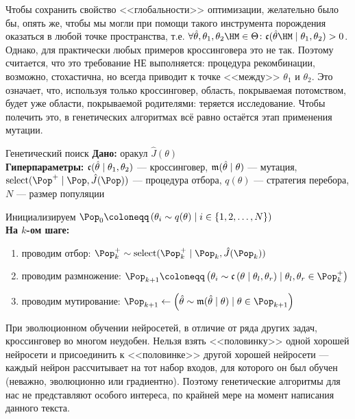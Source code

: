 Чтобы сохранить свойство <<глобальности>> оптимизации, желательно было бы, опять же, чтобы мы могли при помощи такого инструмента порождения оказаться в любой точке пространства, т.е. $\forall \hat{\theta}, \theta_1, \theta_2 \HM\in \Theta \colon \cross(\hat{\theta} \HM\mid \theta_1, \theta_2) > 0$. Однако, для практически любых примеров кроссинговера это не так. Поэтому считается, что это требование НЕ выполняется: процедура рекомбинации, возможно, стохастична, но всегда приводит к точке <<между>> $\theta_1$ и $\theta_2$. Это означает, что, используя только кроссинговер, область, покрываемая потомством, будет уже области, покрываемой родителями: теряется исследование. Чтобы полечить это, в генетических алгоритмах всё равно остаётся этап применения мутации.

\begin{algorithm}[label=geneticsearch]{Генетический поиск}
\textbf{Дано:} оракул $\hat{J}(\theta)$ \\
\textbf{Гиперпараметры:} $\mathfrak{c}(\hat{\theta} \mid \theta_1, \theta_2)$ --- кроссинговер, $\mathfrak{m}(\hat{\theta} \mid \theta)$ --- мутация, $\Sel(\Pop^+ \mid \Pop, \hat{J}(\Pop))$ --- процедура отбора, $q(\theta)$ --- стратегия перебора, $N$ --- размер популяции

\vspace{0.3cm}
Инициализируем $\Pop_0 \coloneqq \left( \theta_i \sim q(\theta) \mid i \in \{1, 2, \dots , N \} \right)$ \\
\textbf{На $k$-ом шаге:}
\begin{enumerate}
    \item проводим отбор: $\Pop^{+}_k \sim \Sel(\Pop^{+}_k \mid \Pop_k, \hat{J}(\Pop_k))$
    \item проводим размножение: $\Pop_{k+1} \coloneqq \left( \theta_i \sim \cross \left( \theta \mid \theta_l, \theta_r \right) \mid \theta_l, \theta_r \in \Pop^{+}_k \right)$
    \item проводим мутирование: $\Pop_{k+1} \leftarrow \left( \hat{\theta} \sim \mut (\hat{\theta} \mid \theta) \mid \theta \in \Pop_{k+1} \right)$
\end{enumerate}
\end{algorithm}

\begin{remark}
При эволюционном обучении нейросетей, в отличие от ряда других задач, кроссинговер во многом неудобен. Нельзя взять <<половинку>> одной хорошей нейросети и присоединить к <<половинке>> другой хорошей нейросети --- каждый нейрон рассчитывает на тот набор входов, для которого он был обучен (неважно, эволюционно или градиентно). Поэтому генетические алгоритмы для нас не представляют особого интереса, по крайней мере на момент написания данного текста. 
\end{remark}

